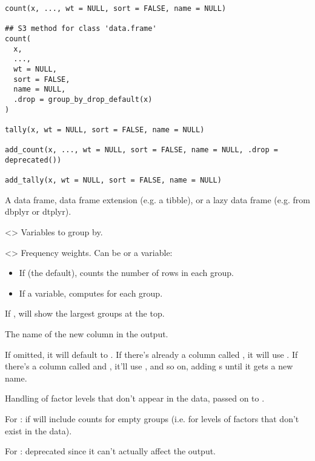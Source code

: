 \documentclass[a4paper]{book}
\begin{document}
%
\begin{Usage}
\begin{verbatim}
count(x, ..., wt = NULL, sort = FALSE, name = NULL)

## S3 method for class 'data.frame'
count(
  x,
  ...,
  wt = NULL,
  sort = FALSE,
  name = NULL,
  .drop = group_by_drop_default(x)
)

tally(x, wt = NULL, sort = FALSE, name = NULL)

add_count(x, ..., wt = NULL, sort = FALSE, name = NULL, .drop = deprecated())

add_tally(x, wt = NULL, sort = FALSE, name = NULL)
\end{verbatim}
\end{Usage}
%
\begin{Arguments}
\begin{ldescription}
\item[\code{x}] A data frame, data frame extension (e.g. a tibble), or a
lazy data frame (e.g. from dbplyr or dtplyr).

\item[\code{...}] <> Variables to group
by.

\item[\code{wt}] <> Frequency weights.
Can be  or a variable:
\begin{itemize}

\item{} If  (the default), counts the number of rows in each group.
\item{} If a variable, computes  for each group.

\end{itemize}


\item[\code{sort}] If , will show the largest groups at the top.

\item[\code{name}] The name of the new column in the output.

If omitted, it will default to . If there's already a column called ,
it will use . If there's a column called  and , it'll use
, and so on, adding s until it gets a new name.

\item[\code{.drop}] Handling of factor levels that don't appear in the data, passed
on to .

For : if  will include counts for empty groups (i.e. for
levels of factors that don't exist in the data).

\strong{[Deprecated]} For : deprecated since it
can't actually affect the output.
\end{ldescription}
\end{Arguments}
\end{document}
